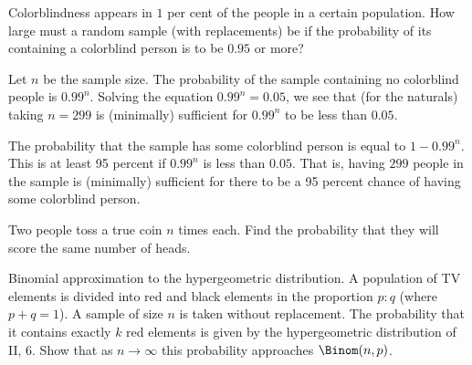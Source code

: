 \newpage

\begin{problem}[Handout 8, \# 14]
  Colorblindness appears in \(1\) per cent of the people in a certain
  population. How large must a random sample (with replacements) be if the
  probability of its containing a colorblind person is to be \(0.95\) or more?
\end{problem}
\begin{solution}
Let $n$ be the sample size. The probability of the sample containing no colorblind people is $0.99^n$. Solving the equation $0.99^n=0.05$, we see that (for the naturals) taking $n = 299$ is (minimally) sufficient for $0.99^n$ to be less than $0.05$.

The probability that the sample has some colorblind person is equal to $1-0.99^n$. This is at least 95 percent if $0.99^n$ is less than $0.05$. That is, having $299$ people in the sample is (minimally) sufficient for there to be a 95 percent chance of having some colorblind person.
\end{solution}
\newpage

\begin{problem}[Handout 8, \# 15]
  Two people toss a true coin \(n\) times each. Find the probability that
  they will score the same number of heads.
\end{problem}
\begin{solution}

\end{solution}
\newpage

\begin{problem}[Handout 8, \# 16]
  Binomial approximation to the hypergeometric distribution. A population
  of TV elements is divided into red and black elements in the proportion
  \(p:q\) (where \(p+q=1\)). A sample of size \(n\) is taken without
  replacement. The probability that it contains exactly \(k\) red elements
  is given by the hypergeometric distribution of II, 6. Show that as
  \(n\to\infty\) this probability approaches \(\Binom(n,p)\).
\end{problem}
\begin{solution}

\end{solution}
\newpage

